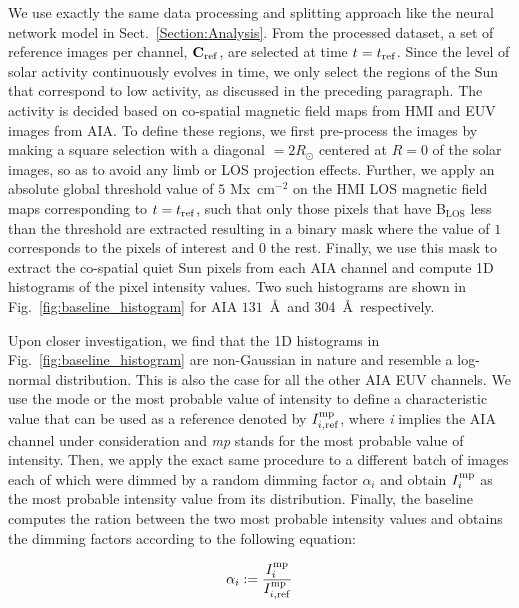 \documentclass[twocolumn,usenames,dvipsnames]{aastex63}
\begin{document}
We use exactly the same data processing and splitting approach like the neural network model in Sect.~\ref{Section:Analysis}. From the processed dataset, a set of reference images per channel, $\mathbf{C_{\rm ref}}$, are selected at time $t=t_{\rm ref}$. Since the level of solar activity continuously evolves in time, we only select the regions of the Sun that correspond to low activity, as discussed in the preceding paragraph. The activity is decided based on co-spatial magnetic field maps from HMI and EUV images from AIA. To define these regions, we first pre-process the images by making a square selection with a diagonal $= 2R_\odot$ centered at $R=0$ of the solar images, so as to avoid any limb or LOS projection effects. Further, we apply an absolute global threshold value of  $5$ Mx~cm$^{-2}$ on the HMI LOS magnetic field maps corresponding to $t=t_{\rm ref}$, such that only those pixels that have B$_{\mathrm{LOS}}$ less than the threshold are extracted resulting in a binary mask where the value of $1$ corresponds to the pixels of interest and $0$ the rest. Finally, we use this mask to extract the co-spatial quiet Sun pixels from each AIA channel and compute 1D histograms of the pixel intensity values. Two such histograms are shown in Fig.~\ref{fig:baseline_histogram} for AIA $131$~\AA\ and 304~\AA\, respectively.

Upon closer investigation, we find that the 1D histograms in Fig.~\ref{fig:baseline_histogram} are non-Gaussian in nature and resemble a log-normal distribution. This is also the case for all the other AIA EUV channels. We use the mode or the most probable value of intensity to define a characteristic value that can be used as a reference denoted by $I_{i,{\rm ref}}^{\rm mp}$, where \textit{i} implies the AIA channel under consideration and \textit{mp} stands for the most probable value of intensity.
Then, we apply the exact same procedure to a different batch of images each of which were dimmed by a random dimming factor $\alpha_i$ and obtain $I^{\rm mp}_{i}$ as the most probable intensity value from its distribution. Finally, the baseline computes the ration between the two most probable intensity values and obtains the dimming factors according to the following equation:

\begin{equation}
    \alpha_i := \frac{I^{\rm mp}_{i}}{I_{i, {\rm ref}}^{\rm mp}}
\end{equation}

\end{document}
